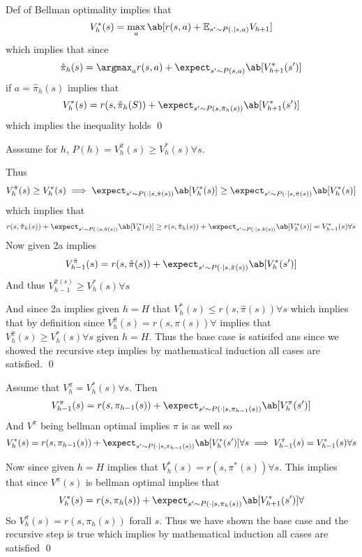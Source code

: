 \documentclass[12pt]{amsart}
\begin{document}
  \begin{problem}
    \begin{subproblem}[][ref:2a]
      Def of Bellman optimality implies that 
      \[V_h^*(s) = \max_a\ab[r(s,a)+\mathbb{E}_{s'\sim P(.|s,a)}V_{h+1}]\]
      which implies that since 
      \[\hat \pi_h(s) = \argmax_ar(s,a)+\expect_{s'\sim P(s,a)}\ab[V_{h+1}^*(s')]\]
      if $a=\hat \pi_h(s)$ implies that 
      \[V_h^*(s) = r(s,\hat \pi_h(S)) + \expect_{s'\sim P(s,\hat \pi_h(s))}\ab[V^*_{h+1}(s')]\]
      which implies the inequality holds \qed 
    \end{subproblem}
    \begin{subproblem}
      Asssume for $h$, $P(h)=V_{h}^{\hat\pi}(s)\geq V_{h}^*(s)\forall s$. 

      Thus 
      \[V_h^{\hat\pi}(s)\geq V_{h}^*(s) \implies \expect_{s'\sim P(\cdot|s,\hat\pi(s))}\ab[V_h^*(s)]\geq \expect_{s'\sim P(\cdot|s,\hat\pi(s))}\ab[V_h^*(s)]\] 
      which implies that 
      \[r(s,\hat\pi_h(s))+ \expect_{s'\sim P(\cdot|s,\hat\pi(s))}\ab[V_h^*(s)]\geq r(s,\hat\pi_h(s)) + \expect_{s'\sim P(\cdot|s,\hat\pi(s))}\ab[V_h^*(s)] = V_{h-1}^*(s)\forall s\] 
      Now given 2a implies 
      \[V_{h-1}^{\hat\pi}(s) = r(s,\hat\pi(s)) + \expect_{s'\sim P(\cdot|s,\hat\pi(s))}\ab[V_h^*(s')] \]
      And thus $V_{h-1}^{\hat\pi(s)}\geq V_h^*(s)\forall s$ 
       
      And since 2a implies given $h=H$ that $V_h^*(s)\leq r(s,\hat \pi(s)) \forall s$ which implies that by definition since $V_h^{\hat\pi}(s)= r(s,\hat\pi(s))\forall$ implies that $V_h^{\hat\pi}(s)\geq V_h^*(s)\forall s$ given $h=H$. Thus the base case is satisifed ans since we showed the recursive step implies by mathematical induction all cases are satisfied. \qed 
    \end{subproblem}
    \begin{subproblem}
      Assume that $V_h^\pi = V_h^*(s)\forall s$. Then
      \[V_{h-1}^\pi(s) = r(s,\pi_{h-1}(s))+\expect_{s'\sim P(\cdot |s,\pi_{h-1}(s))}\ab[V_h^\pi(s')]\] 
      And $V^\pi$ being bellman optimal implies $\pi$ is as well so 
      \[V_h^*(s)=r(s,\pi_{h-1}(s)) + \expect_{s'\sim P(\cdot|s,\pi_{h-1}(s))}\ab[V_h^*(s')]\forall s \implies V_{h-1}^\pi(s)=V_{h-1}^*(s)\forall s\] 
      
      Now since given $h=H$ implies that $V_h^*(s)=r(s,\pi^*(s)) \forall s$. This implies that since $V^\pi(s)$ is bellman optimal implies that 
      \[V_h^*(s)=r(s,\pi_h(s)) + \expect_{s'\sim P(\cdot|s,\pi_h(s))}\ab[V_{h+1}^*(s')]\forall \] 
      So $V_h^\pi(s) = r(s,\pi_h(s))$ forall $s$. Thus we have shown the base case and the recursive step is true which implies by mathematical induction all cases are satisfied \qed  
    \end{subproblem}
  \end{problem} 
\end{document}
